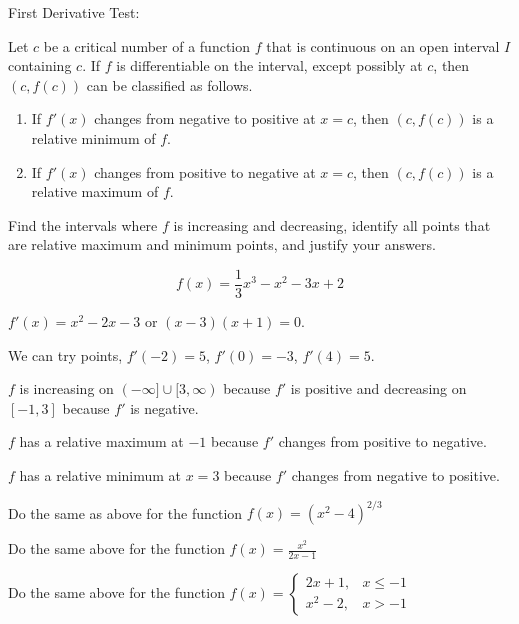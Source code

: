 \documentclass[../bccalc.tex]{subfiles}
\begin{document}
First Derivative Test:

Let $c$ be a critical number of a function $f$ that is continuous on an open interval $I$ containing $c$. If $f$ is differentiable on the interval, except possibly at $c$, then $(c,f(c))$ can be classified as follows.
\begin{enumerate}
    \item If $f'(x)$ changes from negative to positive at $x=c$, then $(c,f(c))$ is a relative minimum of $f$.
    \item If $f'(x)$ changes from positive to negative at $x=c$, then $(c,f(c))$ is a relative maximum of $f$.
\end{enumerate}
\pagebreak
\begin{example}
    Find the intervals where $f$ is increasing and decreasing, identify all points that are relative maximum and minimum points, and justify your answers.

    \[ f(x)=\frac{1}{3}x^3-x^2-3x+2 \]

    $f'(x)=x^2-2x-3$ or $(x-3)(x+1)=0$.

    We can try points, $f'(-2)=5$, $f'(0)=-3$, $f'(4)=5$.

    $f$ is increasing on $(-\infty]\cup [3,\infty)$ because $f'$ is positive and decreasing on $[-1,3]$ because $f'$ is negative.

    $f$ has a relative maximum at $-1$ because $f'$ changes from positive to negative.

    $f$ has a relative minimum at $x=3$ because $f'$ changes from negative to positive.    
\end{example}

\ex Do the same as above for the function $f(x)=(x^2-4)^{2/3}$

\ex Do the same above for the function $f(x)=\frac{x^2}{2x-1}$

\ex Do the same above for the function $f(x)=\begin{cases}
    2x+1, & x\leq -1 \\
    x^2-2, & x>-1
\end{cases}$
\end{document}
